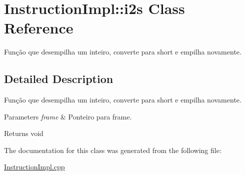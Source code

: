 \hypertarget{class_instruction_impl_1_1i2s}{}\section{Instruction\+Impl\+:\+:i2s Class Reference}
\label{class_instruction_impl_1_1i2s}


Função que desempilha um inteiro, converte para short e empilha novamente.  




\subsection{Detailed Description}
Função que desempilha um inteiro, converte para short e empilha novamente. 


\begin{DoxyParams}{Parameters}
{\em frame} & Ponteiro para frame. \\
\hline
\end{DoxyParams}
\begin{DoxyReturn}{Returns}
void 
\end{DoxyReturn}


The documentation for this class was generated from the following file\+:\begin{DoxyCompactItemize}
\item 
\hyperlink{_instruction_impl_8cpp}{Instruction\+Impl.\+cpp}\end{DoxyCompactItemize}
